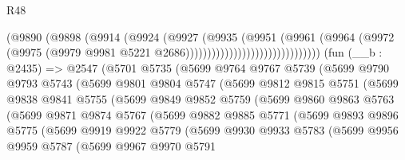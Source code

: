 \begin{lexlean}{R48}
\begin{coremodule}
                                          (@9890
                                            (@9898
                                              (@9914
                                                (@9924
                                                  (@9927
                                                    (@9935
                                                      (@9951
                                                        (@9961
                                                          (@9964
                                                            (@9972
                                                              (@9975
                                                                (@9979
                                                                  @9981
                                                                  @5221
                                                                  @2686)))))))))))))))))))))))))))))))
    (fun (__b : @2435) =>
    @2547
      (@5701
        @5735
        (@5699
          @9764
          @9767
          @5739
          (@5699
            @9790
            @9793
            @5743
            (@5699
              @9801
              @9804
              @5747
              (@5699
                @9812
                @9815
                @5751
                (@5699
                  @9838
                  @9841
                  @5755
                  (@5699
                    @9849
                    @9852
                    @5759
                    (@5699
                      @9860
                      @9863
                      @5763
                      (@5699
                        @9871
                        @9874
                        @5767
                        (@5699
                          @9882
                          @9885
                          @5771
                          (@5699
                            @9893
                            @9896
                            @5775
                            (@5699
                              @9919
                              @9922
                              @5779
                              (@5699
                                @9930
                                @9933
                                @5783
                                (@5699
                                  @9956
                                  @9959
                                  @5787
                                  (@5699
                                    @9967
                                    @9970
                                    @5791

\end{coremodule}
\end{lexlean}
